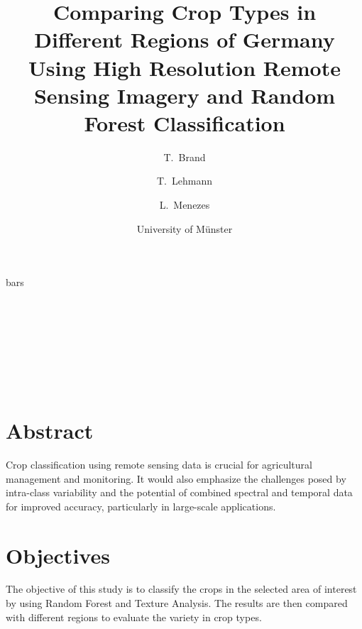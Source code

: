 \documentclass[
  t,%
]{_style/tudelft-beamerposter}
\title[title]{Comparing Crop Types in Different Regions of Germany Using High Resolution Remote Sensing Imagery and Random Forest Classification}
\author[Brand \& Lehmann \& Menezes]{T.~Brand \and T.~Lehmann \and L.~Menezes \and University of Münster}
\renewcommand\maketitle{
  {\begin{beamercolorbox}[
    wd=\paperwidth,
  ]{bars}{%
    \centering\robotoslab%
    \vskip0.01\paperheight
    \begin{minipage}{\textwidth-30mm}\centering
      \Huge\inserttitle\\[0.01\paperheight]
      \LARGE\insertsubtitle\\[0.01\paperheight]
      \insertauthor\\[0.01\paperheight]
      \normalsize\insertinstitute\\[0.01\paperheight]
    \end{minipage}\\
    \vskip0.01\paperheight
  }\end{beamercolorbox}}%
}
\begin{document}
\begin{frame}
  \maketitle

  \begin{columns}[onlytextwidth, T]
    \begin{column}{}
        \begin{columns}[T]
            \begin{column}{}
            
              \section*{Abstract}
              \justifying
               Crop classification using remote sensing data is crucial for agricultural management and monitoring. It would also emphasize the challenges posed by intra-class variability and the potential of combined spectral and temporal data for improved accuracy, particularly in large-scale applications. 
              
              \section*{Objectives}
              \justifying
              The objective of this study is to classify the crops in the selected area of interest by using Random Forest and Texture Analysis. The results are then compared with different regions to evaluate the variety in crop types.
            \end{column}
            

\end{columns}
\end{column}
\end{columns}
\end{frame}
\end{document}
